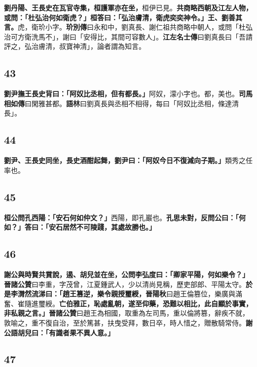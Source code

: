 \textbf{劉丹陽、王長史在瓦官寺集，桓護軍亦在坐，}{\footnotesize 桓伊已見。}\textbf{共商略西朝及江左人物，或問：「杜弘治何如衛虎？」桓答曰：「弘治膚清，衛虎奕奕神令。」王、劉善其言。}{\footnotesize 虎，衛玠小字。\textbf{玠別傳}曰永和中，劉真長、謝仁祖共商略中朝人，或問「杜弘治可方衛洗馬不」，謝曰「安得比，其間可容數人」。\textbf{江左名士傳}曰劉真長曰「吾請評之，弘治膚清，叔寶神清」，論者謂為知言。}

\subsection*{43}

\textbf{劉尹撫王長史背曰：「阿奴比丞相，但有都長。」}{\footnotesize 阿奴，濛小字也。都，美也。\textbf{司馬相如傳}曰閑雅甚都。\textbf{語林}曰劉真長與丞相不相得，每曰「阿奴比丞相，條達清長」。}

\subsection*{44}

\textbf{劉尹、王長史同坐，長史酒酣起舞，劉尹曰：「阿奴今日不復減向子期。」}{\footnotesize 類秀之任率也。}

\subsection*{45}

\textbf{桓公問孔西陽：「安石何如仲文？」}{\footnotesize 西陽，即孔巖也。}\textbf{孔思未對，反問公曰：「何如？」答曰：「安石居然不可陵踐，其處故勝也。」}

\subsection*{46}

\textbf{謝公與時賢共賞說，遏、胡兒並在坐，公問李弘度曰：「卿家平陽，何如樂令？」}{\footnotesize \textbf{晉諸公贊}曰李重，字茂曾，江夏鍾武人，少以清尚見稱，歷吏部郎、平陽太守。}\textbf{於是李潸然流涕曰：「趙王篡逆，樂令親授璽綬，}{\footnotesize \textbf{晉陽秋}曰趙王倫篡位，樂廣與滿奮、崔隨進璽綬。}\textbf{亡伯雅正，恥處亂朝，遂至仰藥，恐難以相比，此自顯於事實，非私親之言。」}{\footnotesize \textbf{晉諸公贊}曰趙王為相國，取重為左司馬，重以倫將篡，辭疾不就，敦喻之，重不復自治，至於篤甚，扶曳受拜，數日卒，時人惜之，贈散騎常侍。}\textbf{謝公語胡兒曰：「有識者果不異人意。」}

\subsection*{47}

